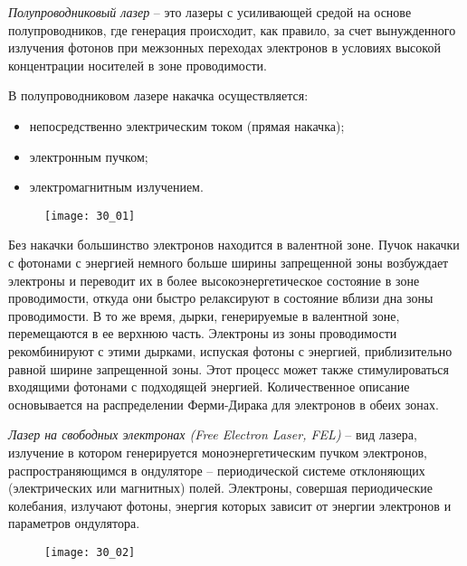 

\emph{Полупроводниковый лазер} -- это лазеры с усиливающей средой на основе 
полупроводников, где генерация происходит, как правило, за счет вынужденного 
излучения фотонов при межзонных переходах электронов в условиях высокой 
концентрации носителей в зоне проводимости. 

В полупроводниковом лазере накачка осуществляется:
\begin{itemize}
	\item непосредственно электрическим током (прямая накачка);
    \item электронным пучком;
    \item электромагнитным излучением.
\end{itemize}

\begin{figure}[h!]
    \center
    \texttt{[image: 30\_01]}
\end{figure}

Без накачки большинство электронов находится в валентной зоне. Пучок накачки с 
фотонами с энергией немного больше ширины запрещенной зоны возбуждает 
электроны и переводит их в более высокоэнергетическое состояние в зоне 
проводимости, откуда они быстро релаксируют в состояние вблизи дна зоны 
проводимости. В то же время, дырки, генерируемые в валентной зоне, 
перемещаются в ее верхнюю часть. Электроны из зоны проводимости 
рекомбинируют с этими дырками, испуская фотоны с энергией, приблизительно 
равной ширине запрещенной зоны. Этот процесс может также стимулироваться 
входящими фотонами с подходящей энергией. Количественное описание основывается 
на распределении Ферми-Дирака для электронов в обеих зонах.


\emph{Лазер на свободных электронах (Free Electron Laser, FEL)} -- вид лазера, 
излучение в котором генерируется моноэнергетическим пучком электронов, 
распространяющимся в ондуляторе -- периодической системе отклоняющих 
(электрических или магнитных) полей. Электроны, совершая периодические 
колебания, излучают фотоны, энергия которых зависит от энергии электронов и 
параметров ондулятора.

\begin{figure}[h!]
    \center
    \texttt{[image: 30\_02]}
\end{figure}

